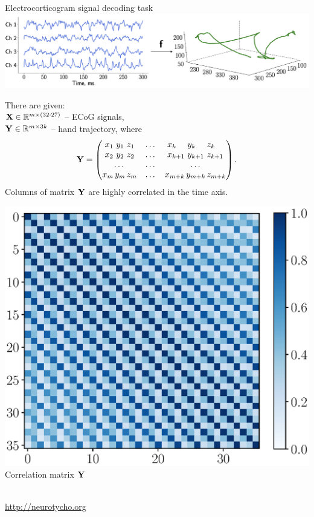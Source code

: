 \documentclass[10pt]{beamer}
\begin{document}
\begin{frame}{Electrocorticogram signal decoding task}
    \includegraphics[width=1.0\linewidth]{figs/slide3_1}
	\begin{minipage}{.58\linewidth}
 	There are given: \\
	$\mathbf{X} \in \mathbb{R}^{m \times (32 \cdot 27)}$ -- ECoG signals, \\
	$\mathbf{Y} \in \mathbb{R}^{m \times 3k}$ -- hand trajectory, where
	\vspace{0.1cm}
	\[
		\mathbf{Y} = 
		\begin{pmatrix}
		x_1 \,\, y_1 \,\, z_1 & \dots & x_{k\hphantom{+1}} \,\, y_{k\hphantom{+1}} \,\, z_{k\hphantom{+1}}\\
		x_2 \,\, y_2 \,\, z_2 & \dots & x_{k + 1} \,\, y_{k + 1} \,\, z_{k + 1}\\
		 \dots & \dots & \dots  \\
		x_m \, y_m \, z_m & \dots & x_{m + k} \, y_{m + k} \, z_{m + k}
		\end{pmatrix}.
	\]
	Columns of matrix $\mathbf{Y}$ are highly correlated in the time axis.
	\end{minipage}%
	\begin{minipage}{.42\linewidth}
		\includegraphics[width=\linewidth]{figs/Y_corr_matrix.eps} \\
		\centering Correlation matrix $\mathbf{Y}$
	\end{minipage}
	\\
	\url{http://neurotycho.org}
\end{frame}
\end{document}
